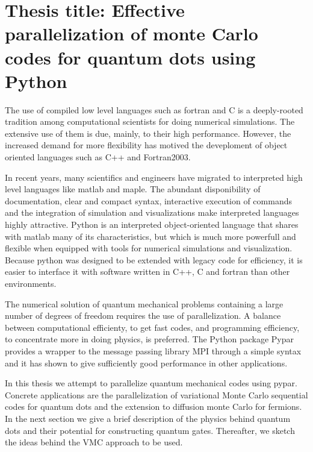 \newcommand{\OP}[1]{{\bf\widehat{#1}}}

\newcommand{\be}{\begin{equation}}

\newcommand{\ee}{\end{equation}}



\pagestyle{plain}

\section*{Thesis title: Effective parallelization of monte Carlo codes for quantum dots using Python}


The use of compiled low level languages such as fortran and C is a 
deeply-rooted tradition among computational scientists for doing numerical simulations. The extensive use of them is due, mainly, to their high performance. However, the increased demand for more flexibility has motived the deveploment of object oriented languages such as C++  and Fortran2003.  


In recent years, many scientifics and engineers 
have migrated to interpreted high level languages like matlab and maple. 
The abundant disponibility of documentation, clear and compact syntax, 
interactive execution of commands and the integration of simulation 
and visualizations make interpreted languages highly attractive. Python 
is an interpreted object-oriented language that shares with matlab 
many of its characteristics, but which is much more powerfull 
and flexible when equipped with tools for numerical simulations 
and visualization. Because python was designed to be extended with 
legacy code for efficiency, it is easier to interface 
it with  software written in C++, C and fortran than other environments. 

The numerical solution of quantum mechanical problems containing 
a large number of degrees of freedom requires the use of parallelization. 
A balance between computational efficienty, to get fast codes, 
and programming efficiency, to concentrate more in doing physics, 
is preferred. The Python package Pypar provides a wrapper to the message 
passing library MPI through a simple syntax and it has shown to 
give sufficiently good performance in other applications.

In this thesis we attempt to parallelize quantum mechanical 
codes using pypar. Concrete applications are the parallelization 
of  variational Monte Carlo sequential codes for quantum dots and 
the extension to diffusion monte Carlo for fermions. 
In the next section we give a brief description of the 
physics behind quantum dots and their potential for constructing quantum gates. Thereafter, we sketch the ideas behind the VMC approach to be used.



